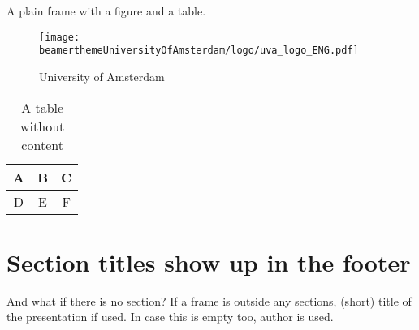 \documentclass[pdf]{beamer}
\begin{document}
\begin{frame}[plain]

	A plain frame with a figure and a table.

	\vfill

	\begin{figure}
		\caption{University of Amsterdam}\label{fig:uva-logo}
		\texttt{[image: beamerthemeUniversityOfAmsterdam/logo/uva\_logo\_ENG.pdf]}
	\end{figure}
	
	\begin{table}
		\begin{tabular}{|c|c|c|}
			\hline
			A & B & C \\
			\hline
			D & E & F \\
			\hline
		\end{tabular}
		\caption{A table without content}\label{tab:nonsense}
	\end{table}
\end{frame}

\section{Section titles show up in the footer}

\begin{frame}{\insertsectionhead}
	\begin{alertblock}{And what if there is no section?}
		If a frame is outside any sections, (short) title of the presentation if used. In case this is empty too, author is used.
	\end{alertblock}
\end{frame}
\end{document}
